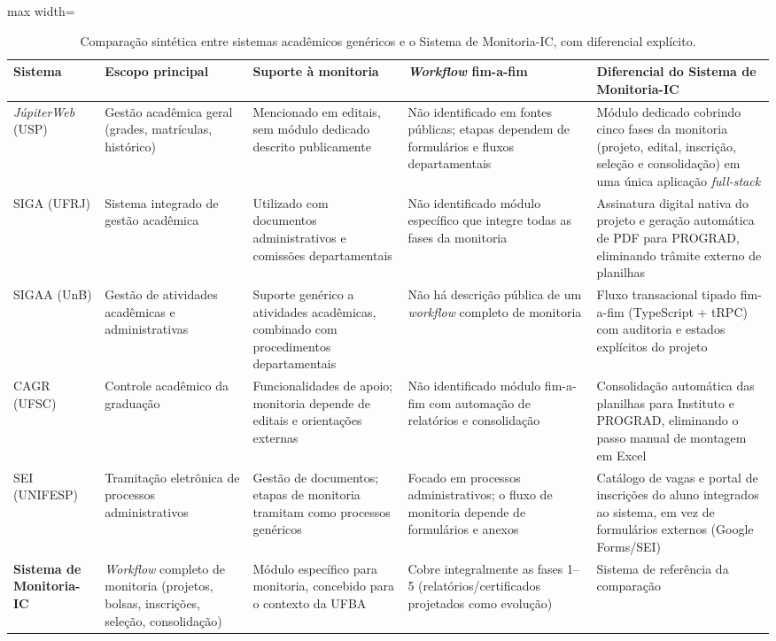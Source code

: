 \documentclass[portuguese]{sbc2025}%
\begin{document}
\begin{table}[!htbp]
  \centering
  \caption{Comparação sintética entre sistemas acadêmicos genéricos e o Sistema de Monitoria-IC, com diferencial explícito.}
  \label{tab:comparacao-sistemas}
  \begin{adjustbox}{max width=\textwidth}
    \begin{tabular}{|l|p{2.8cm}|p{3.2cm}|p{3.3cm}|p{4.4cm}|}
      \hline
      \textbf{Sistema} & \textbf{Escopo principal} & \textbf{Suporte à monitoria} & \textbf{\textit{Workflow} fim-a-fim} & \textbf{Diferencial do Sistema de Monitoria-IC} \\
      \hline
      \textit{JúpiterWeb} (USP) & Gestão acadêmica geral (grades, matrículas, histórico) & Mencionado em editais, sem módulo dedicado descrito publicamente & Não identificado em fontes públicas; etapas dependem de formulários e fluxos departamentais & Módulo dedicado cobrindo cinco fases da monitoria (projeto, edital, inscrição, seleção e consolidação) em uma única aplicação \textit{full-stack} \\
      \hline
      SIGA (UFRJ) & Sistema integrado de gestão acadêmica & Utilizado com documentos administrativos e comissões departamentais & Não identificado módulo específico que integre todas as fases da monitoria & Assinatura digital nativa do projeto e geração automática de PDF para PROGRAD, eliminando trâmite externo de planilhas \\
      \hline
      SIGAA (UnB) & Gestão de atividades acadêmicas e administrativas & Suporte genérico a atividades acadêmicas, combinado com procedimentos departamentais & Não há descrição pública de um \textit{workflow} completo de monitoria & Fluxo transacional tipado fim-a-fim (TypeScript + tRPC) com auditoria e estados explícitos do projeto \\
      \hline
      CAGR (UFSC) & Controle acadêmico da graduação & Funcionalidades de apoio; monitoria depende de editais e orientações externas & Não identificado módulo fim-a-fim com automação de relatórios e consolidação & Consolidação automática das planilhas para Instituto e PROGRAD, eliminando o passo manual de montagem em Excel \\
      \hline
      SEI (UNIFESP) & Tramitação eletrônica de processos administrativos & Gestão de documentos; etapas de monitoria tramitam como processos genéricos & Focado em processos administrativos; o fluxo de monitoria depende de formulários e anexos & Catálogo de vagas e portal de inscrições do aluno integrados ao sistema, em vez de formulários externos (Google Forms/SEI) \\
      \hline
      \textbf{Sistema de Monitoria-IC} & \textit{Workflow} completo de monitoria (projetos, bolsas, inscrições, seleção, consolidação) & Módulo específico para monitoria, concebido para o contexto da UFBA & Cobre integralmente as fases 1--5 (relatórios/certificados projetados como evolução) & Sistema de referência da comparação \\
      \hline
    \end{tabular}
  \end{adjustbox}
\end{table}
\end{document}
